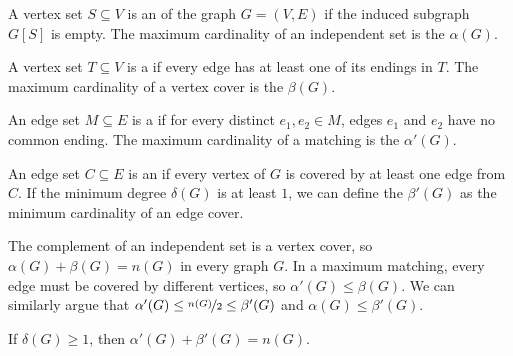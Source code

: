 
\begin{definition}
  A vertex set $S \subseteq V$ is an  of the graph $G =
  (V, E)$ if the induced subgraph $G[S]$ is empty.
  The maximum cardinality of an independent set is the  $\alpha(G)$.
\end{definition}

\begin{definition}
  A vertex set $T \subseteq V$ is a  if every edge has at least one
  of its endings in $T$.
  The maximum cardinality of a vertex cover is the 
  $\beta(G)$.
\end{definition}

\begin{definition}
  An edge set $M \subseteq E$ is a  if for every distinct $e_1,
  e_2 \in M$, edges $e_1$ and $e_2$ have no common ending.
  The maximum cardinality of a matching is the 
  $\alpha'(G)$.
\end{definition}

\begin{definition}
  An edge set $C \subseteq E$ is an  if every vertex of $G$ is
  covered by at least one edge from $C$.
  If the minimum degree $\delta(G)$ is at least $1$, we can define the
   $\beta'(G)$ as the minimum cardinality of an edge
  cover.
\end{definition}


\begin{remark}
  The complement of an independent set is a vertex cover, so $\alpha(G) +
  \beta(G) = n(G)$ in every graph $G$.
  In a maximum matching, every edge must be covered by different vertices, so
  $\alpha'(G) \le \beta(G)$.
  We can similarly argue that $\alpha'(G) \le \nicefrac{n(G)}{2} \le \beta'(G)$
  and $\alpha(G) \le \beta'(G)$.
\end{remark}

\begin{theorem}[Gallai]
  If $\delta(G) \ge 1$, then $\alpha'(G) + \beta'(G) = n(G)$.
\end{theorem}

